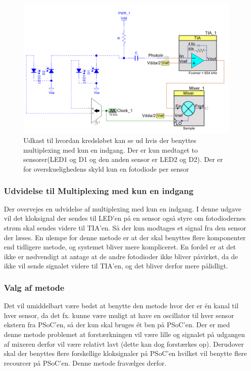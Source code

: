 \documentclass[HardwareDesign/HardwareDesign_main.tex]{subfiles}
\begin{document}
\begin{figure}[H]
    \centering
    \includegraphics[width=1\textwidth]{HardwareDesign/CupSensor/graphics/Multiplexing_en_indgang.PNG}
    \caption{Udkast til hvordan kredsløbet kan se ud hvis der benyttes multiplexing med kun en indgang. Der er kun medtaget to sensorer(LED1 og D1 og den anden sensor er LED2 og D2). Der er for overskuelighedens skyld kun en fotodiode per sensor}
    \label{fig:multiplexing_en_indgang}
\end{figure}


\subsubsection{Udvidelse til Multiplexing med kun en indgang}
Der overvejes en udvidelse af multiplexing med kun en indgang. I denne udgave vil det kloksignal der sendes til LED'en på en sensor også styre om fotodiodernes strøm skal sendes videre til TIA'en. Så der kun modtages et signal fra den sensor der læses. En ulempe for denne metode er at der skal benyttes flere komponenter end tidligere metode, og systemet bliver mere kompliceret. En fordel er at det ikke er nødvendigt at antage at de andre fotodioder ikke bliver påvirket, da de ikke vil sende signalet videre til TIA'en, og det bliver derfor mere pålidligt.

\subsubsection{Valg af metode}
Det vil umiddelbart være bedst at benytte den metode hvor der er én kanal til hver sensor, da det fx. kunne være muligt at have en oscillator til hver sensor ekstern fra PSoC'en, så der kun skal bruges ét ben på PSoC'en. Der er med denne metode problemet at forstærkningen vil være lille og signalet på udgangen af mixeren derfor vil være relativt lavt (dette kan dog forstærkes op). Derudover skal der benyttes flere forskellige kloksignaler på PSoC'en hvilket vil benytte flere recourcer på PSoC'en. Denne metode fravælges derfor. 
\end{document}
